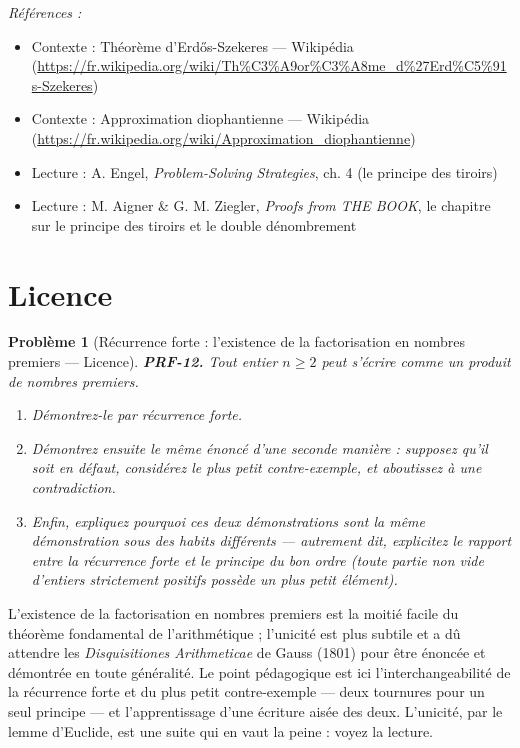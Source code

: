 \documentclass[11pt]{article}
\newtheorem{problem}{Problème}
\newenvironment{refs}{\par\small\noindent\emph{Références :}\begin{itemize}\setlength\itemsep{0pt}}{\end{itemize}\normalsize}
\begin{document}
\begin{refs}
\item Contexte : Théorème d'Erd\H{o}s-Szekeres --- Wikipédia (\url{https://fr.wikipedia.org/wiki/Th%C3%A9or%C3%A8me_d%27Erd%C5%91s-Szekeres})
\item Contexte : Approximation diophantienne --- Wikipédia (\url{https://fr.wikipedia.org/wiki/Approximation_diophantienne})
\item Lecture : A. Engel, \textit{Problem-Solving Strategies}, ch. 4 (le principe des tiroirs)
\item Lecture : M. Aigner \& G. M. Ziegler, \textit{Proofs from THE BOOK}, le chapitre sur le principe des tiroirs et le double dénombrement
\end{refs}

\bigskip


\section*{Licence}

\begin{problem}[{Récurrence forte : l'existence de la factorisation en nombres premiers --- Licence}]
\textbf{PRF-12.} Tout entier $ n \ge 2 $ peut s'écrire comme un produit de nombres
premiers.
\begin{enumerate}
\item[(a)] Démontrez-le par récurrence forte.
\item[(b)] Démontrez ensuite le même énoncé d'une seconde manière : supposez qu'il soit en
défaut, considérez le \textit{plus petit} contre-exemple, et aboutissez à une
contradiction.
\item[(c)] Enfin, expliquez pourquoi ces deux démonstrations sont la même démonstration sous des
habits différents --- autrement dit, explicitez le rapport entre la récurrence forte et le
principe du bon ordre (toute partie non vide d'entiers strictement positifs possède un plus
petit élément).
\end{enumerate}

\end{problem}

\noindent L'existence de la factorisation en nombres premiers est la moitié facile
du théorème fondamental de l'arithmétique ; l'unicité est plus subtile et a dû attendre les
\textit{Disquisitiones Arithmeticae} de Gauss (1801) pour être énoncée et démontrée en toute
généralité. Le point pédagogique est ici l'interchangeabilité de la récurrence forte et du
plus petit contre-exemple --- deux tournures pour un seul principe --- et l'apprentissage d'une
écriture aisée des deux. L'unicité, par le lemme d'Euclide, est une suite qui en vaut la
peine : voyez la lecture.
\end{document}
